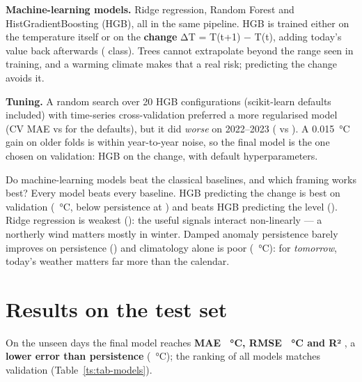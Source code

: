 \textbf{Machine-learning models.} Ridge regression, Random Forest and HistGradientBoosting (HGB), all in the same
pipeline. HGB is trained either on the temperature itself or on the \textbf{change} ΔT = T(t+1) − T(t), adding today's value
back afterwards ( class). Trees cannot extrapolate beyond the range seen in training, and a warming climate
makes that a real risk; predicting the change avoids it.

\textbf{Tuning.} A random search over 20 HGB configurations (scikit-learn defaults included) with time-series cross-validation
preferred a more regularised model (CV MAE \TSCvTuned{} vs \TSCvDefault{} for the defaults), but it did \emph{worse} on
2022–2023 (\TSValTuned{} vs \TSValFinal). A 0.015~°C gain on older folds is within year-to-year noise, so the final model is
the one chosen on validation: HGB on the change, with default hyperparameters.

\begin{table}[H]\centering\small
\caption{One-day-ahead forecasts: validation (2022–2023) and test (2024 – September 2026) scores. Skill = 1 − MAE / MAE of persistence (test).}\label{ts:tab-models}

\end{table}
\begin{finding}
\Q Do machine-learning models beat the classical baselines, and which framing works best?
\F Every model beats every baseline. HGB predicting the change is best on validation (\TSValFinal~°C, \TSValSkill{} below
persistence at \TSValPersist) and beats HGB predicting the level (\TSValLevel). Ridge regression is weakest (\TSValRidge): the
useful signals interact non-linearly — a northerly wind matters mostly in winter. Damped anomaly persistence barely improves on
persistence (\TSValDamped) and climatology alone is poor (\TSValClim~°C): for \emph{tomorrow}, today's weather matters far more
than the calendar.
\end{finding}

\section{Results on the test set}\label{ts:results}
On the \TSTest{} unseen days the final model reaches \textbf{MAE \TSTestFinal~°C, RMSE \TSTestRmse~°C and R² \TSTestRtwo},
a \textbf{\TSTestSkill{} lower error than persistence} (\TSTestPersist~°C); the ranking of all models matches validation
(Table~\ref{ts:tab-models}).


